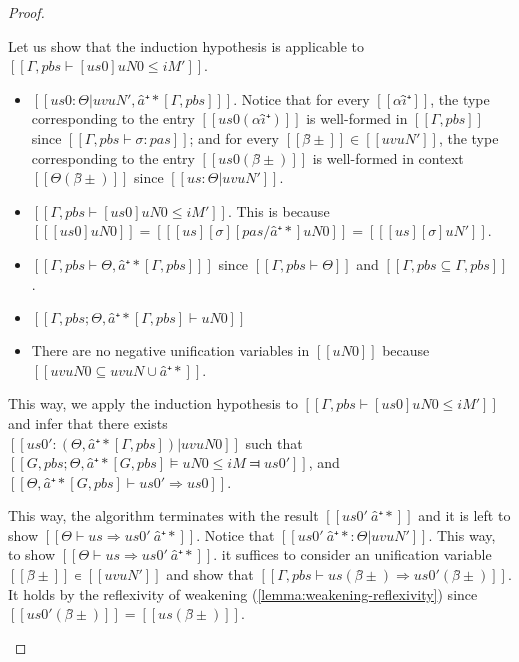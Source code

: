 \begin{proof}
\begin{caseof}
       Let us show that the induction hypothesis is applicable to 
       $[[Γ, pbs ⊢ [us0]uN0 ≤ iM' ]]$.
       \begin{itemize}
        \item $[[ us0 : Θ|uv uN', â⁺*[Γ, pbs] ]]$. Notice that for every $[[αî⁺]]$, 
            the type corresponding to the entry $[[us0(αî⁺)]]$ 
            is well-formed in $[[Γ, pbs]]$ since $[[Γ, pbs ⊢ σ : pas ]]$;
            and for every $[[β̂±]] \in [[uv uN']]$, 
            the type corresponding to the entry $[[us0(β̂±)]]$ is well-formed in
            context $[[Θ(β̂±)]]$ since $[[us : Θ | uv uN']]$.
        \item $[[Γ, pbs ⊢ [us0]uN0 ≤ iM' ]]$. This is because
            $[[ [us0]uN0 ]] = [[ [us][σ][pas/â⁺*]uN0 ]] = [[ [us][σ]uN' ]]$.
        \item $[[ Γ, pbs ⊢ Θ, â⁺*[Γ, pbs] ]]$ since
            $[[Γ, pbs ⊢ Θ]]$ and $[[ {Γ, pbs} ⊆ {Γ, pbs} ]]$.
        \item $[[Γ, pbs ; Θ, â⁺*[Γ, pbs] ⊢ uN0 ]]$
        \item There are no negative unification variables in $[[uN0]]$ because
            $[[ uv uN0 ⊆ uv uN ∪ {â⁺*} ]]$.
       \end{itemize}

       This way, we apply the induction hypothesis to $[[Γ, pbs ⊢ [us0]uN0 ≤ iM' ]]$ and 
       infer that there exists\\
        $[[us0' :  (Θ, â⁺*[Γ, pbs]) | uv uN0]]$ such that
       $[[G, pbs; Θ, â⁺*[G, pbs] ⊨ uN0 ≤ iM ⫤ us0']]$,
       and $[[Θ, â⁺*[G, pbs] ⊢ us0' ⇒ us0]]$.

       This way, the algorithm terminates with the result $[[us0' \ {â⁺*}]]$
       and it is left to show $[[ Θ ⊢ us ⇒ us0' \ {â⁺*} ]]$. Notice that
       $[[us0' \ {â⁺*} : Θ | uv uN' ]]$. This way, to show $[[ Θ ⊢ us ⇒ us0' \
       {â⁺*} ]]$. it suffices to consider an unification variable $[[β̂±]] ∊
       [[uv uN']]$ and show that $[[Γ, pbs ⊢ us(β̂±) ⇒ us0'(β̂±)]]$. It holds by the
       reflexivity of weakening (\cref{lemma:weakening-reflexivity}) since
       $[[us0'(β̂±)]] = [[us(β̂±)]]$.
    \end{caseof}
\end{proof}


